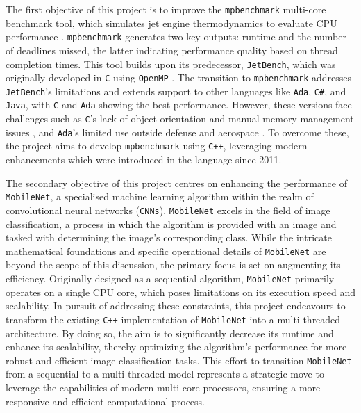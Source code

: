 \documentclass[12pt, openany]{book}
\begin{document}
The first objective of this project is to improve the \texttt{mpbenchmark} multi-core benchmark tool, which simulates jet engine thermodynamics to evaluate CPU performance \cite{mpbenchmark_paper}. \texttt{mpbenchmark} generates two key outputs: runtime and the number of deadlines missed, the latter indicating performance quality based on thread completion times. This tool builds upon its predecessor, \texttt{JetBench}, which was originally developed in \texttt{C} using \texttt{OpenMP} \cite{JetBench_paper}. The transition to \texttt{mpbenchmark} addresses \texttt{JetBench}'s limitations and extends support to other languages like \texttt{Ada}, \texttt{C\#}, and \texttt{Java}, with \texttt{C} and \texttt{Ada} showing the best performance. However, these versions face challenges such as \texttt{C}'s lack of object-orientation and manual memory management issues \cite{c_language_drawbacks}, and \texttt{Ada}'s limited use outside defense and aerospace \cite{ada_langauge_uses}. To overcome these, the project aims to develop \texttt{mpbenchmark} using \texttt{C++}, leveraging modern enhancements which were introduced in the language since 2011\cite{evolution_of_C++}.

The secondary objective of this project centres on enhancing the performance of \texttt{MobileNet}, a specialised machine learning algorithm within the realm of convolutional neural networks (\texttt{CNNs})\cite{mobilenet_paper}. \texttt{MobileNet} excels in the field of image classification, a process in which the algorithm is provided with an image and tasked with determining the image's corresponding class. While the intricate mathematical foundations and specific operational details of \texttt{MobileNet} are beyond the scope of this discussion, the primary focus is set on augmenting its efficiency. Originally designed as a sequential algorithm, \texttt{MobileNet} primarily operates on a single CPU core, which poses limitations on its execution speed and scalability. In pursuit of addressing these constraints, this project endeavours to transform the existing \texttt{C++} implementation of \texttt{MobileNet}\cite{mobilenet_repo} into a multi-threaded architecture. By doing so, the aim is to significantly decrease its runtime and enhance its scalability, thereby optimizing the algorithm's performance for more robust and efficient image classification tasks. This effort to transition \texttt{MobileNet} from a sequential to a multi-threaded model represents a strategic move to leverage the capabilities of modern multi-core processors, ensuring a more responsive and efficient computational process.
\end{document}
